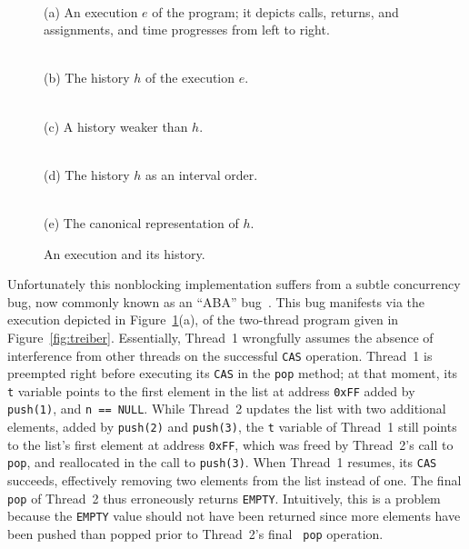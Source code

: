 \begin{figure}[t]
  \footnotesize
  \centering
   \\
  \smallskip
  \parbox{0.8\linewidth}{(a) An execution $e$ of the program; it depicts calls,
  returns, and assignments, and time progresses from left to right.}

  \bigskip
  \begin{minipage}{43mm}
     \\
    (b) The history $h$ of the execution $e$.
  \end{minipage}
  \begin{minipage}{40mm}
     \\
    (c) A history weaker than $h$.
  \end{minipage}

  \bigskip
   \\
  (d) The history $h$ as an interval order.

  \bigskip
   \\
  (e) The canonical representation of $h$.

  \caption{An execution and its history.}
  \label{fig:stacks}
\end{figure}

Unfortunately this nonblocking implementation suffers from a subtle concurrency
bug, now commonly known as an ``ABA'' bug~\cite{tr/ibm/Michael04}. This bug
manifests via the execution depicted in Figure~\ref{fig:stacks}(a), of the two-thread
program given in Figure~\ref{fig:treiber}.
Essentially, Thread~1 wrongfully assumes the absence of interference from other
threads on the successful {\tt CAS} operation. Thread~1 is preempted right
before executing its {\tt CAS} in the {\tt pop} method; at that moment, its
{\tt t} variable points to the first element in the list at address {\tt 0xFF}
added by {\tt push(1)}, and {\tt n == NULL}. While Thread~2 updates the list
with two additional elements, added by {\tt push(2)} and {\tt push(3)}, the
{\tt t} variable of Thread~1 still points to the list's first element at
address {\tt 0xFF}, which was freed by Thread~2's call to {\tt pop}, and
reallocated in the call to {\tt push(3)}. When Thread~1 resumes, its {\tt CAS}
succeeds, effectively removing two elements from the list instead of one. The
final {\tt pop} of Thread~2 thus erroneously returns {\tt EMPTY}. Intuitively,
this is a problem because the {\tt EMPTY} value should not have been returned
since more elements have been pushed than popped prior to Thread~2's final {\tt
pop} operation.

